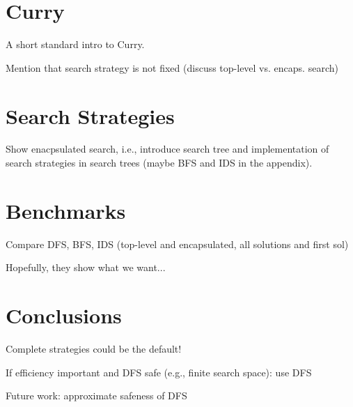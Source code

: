 \documentclass[english]{lni}
\begin{document}
\section{Curry}

A short standard intro to Curry.

Mention that search strategy is not fixed
 (discuss top-level vs. encaps. search)

\section{Search Strategies}
\label{sec:strategies}

Show enacpsulated search, i.e., introduce search tree
and implementation of search strategies in search trees
(maybe BFS and IDS in the appendix).

\section{Benchmarks}
\label{sec:benchmarks}

Compare DFS, BFS, IDS (top-level and encapsulated, all solutions and first sol)

Hopefully, they show what we want...

\section{Conclusions}
\label{sec:conclusions}

Complete strategies could be the default!

If efficiency important and DFS safe (e.g., finite search space): use DFS

Future work: approximate safeness of DFS


%

\end{document}
